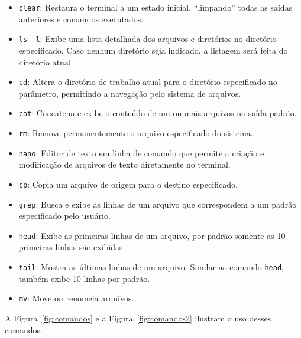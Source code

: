 \documentclass[
	12pt,				%
	oneside,   	        %
	a4paper,			%
	english,			%
	french,				%
	spanish,			%
	brazil,				%
	]{pacotes/abntex2}
\begin{document}
\begin{itemize}
    \item \texttt{clear}: Restaura o terminal a um estado inicial, ``limpando'' todas as saídas anteriores e comandos executados.

    \item \texttt{ls -l}: Exibe uma lista detalhada dos arquivos e diretórios no diretório especificado. Caso nenhum diretório seja indicado, a listagem será feita do diretório atual.

    \item \texttt{cd}: Altera o diretório de trabalho atual para o diretório especificado no parâmetro, permitindo a navegação pelo sistema de arquivos.

    \item \texttt{cat}: Concatena e exibe o conteúdo de um ou mais arquivos na saída padrão.

    \item \texttt{rm}: Remove permanentemente o arquivo especificado do sistema.

    \item \texttt{nano}: Editor de texto em linha de comando que permite a criação e modificação de arquivos de texto diretamente no terminal.

    \item \texttt{cp}: Copia um arquivo de origem para o destino especificado.

    \item \texttt{grep}: Busca e exibe as linhas de um arquivo que correspondem a um padrão especificado pelo usuário.

    \item \texttt{head}: Exibe as primeiras linhas de um arquivo, por padrão somente as 10 primeiras linhas são exibidas. 

    \item \texttt{tail}: Mostra as últimas linhas de um arquivo. Similar ao comando \texttt{head}, também exibe 10 linhas por padrão.

    \item \texttt{mv}: Move ou renomeia arquivos. 
\end{itemize}

A Figura~\ref{fig:comandos} e a Figura~\ref{fig:comandos2} ilustram o uso desses comandos.
\end{document}
